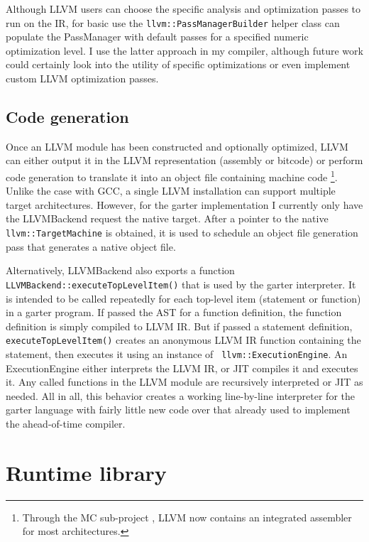 \documentclass[11pt]{article}
\begin{document}
Although LLVM users can choose the specific analysis and optimization passes to
run on the IR, for basic use the {\tt llvm::PassManagerBuilder} helper class can
populate the PassManager with default passes for a specified numeric
optimization level.  I use the latter approach in my compiler, although future
work could certainly look into the utility of specific optimizations or even
implement custom LLVM optimization passes.

\subsection{Code generation}

Once an LLVM module has been constructed and optionally optimized, LLVM can
either output it in the LLVM representation (assembly or bitcode) or perform
code generation to translate it into an object file containing machine code
\footnote{Through the MC sub-project \cite{mc}, LLVM now contains an integrated
assembler for most architectures.}.  Unlike the case with GCC, a single LLVM
installation can support multiple target architectures.  However, for the garter
implementation I currently only have the LLVMBackend request the native target.
After a pointer to the native {\tt llvm::TargetMachine} is obtained, it is used
to schedule an object file generation pass that generates a native object file.

Alternatively, LLVMBackend also exports a function {\tt
LLVMBackend::executeTopLevelItem()} that is used by the garter interpreter.  It
is intended to be called repeatedly for each top-level item (statement or
function) in a garter program.  If passed the AST for a function definition, the
function definition is simply compiled to LLVM IR.  But if passed a statement
definition, {\tt executeTopLevelItem()} creates an anonymous LLVM IR function
containing the statement, then executes it using an instance of {\tt
llvm::ExecutionEngine}.  An ExecutionEngine either interprets the LLVM IR, or
JIT compiles it and executes it.  Any called functions in the LLVM module are
recursively interpreted or JIT as needed.  All in all, this behavior creates a
working line-by-line interpreter for the garter language with fairly little new
code over that already used to implement the ahead-of-time compiler.

\section{Runtime library}
\end{document}
